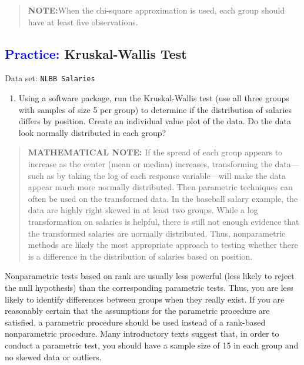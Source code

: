 \documentclass[
]{report}
\providecommand{\tightlist}{%
  \setlength{\itemsep}{0pt}\setlength{\parskip}{0pt}}
\begin{document}
\begin{quote}
\textbf{NOTE:}When the chi-square approximation is used, each group should have at least five observations.
\end{quote}

\hypertarget{kruskal-wallis-test}{%
\subsection*{\texorpdfstring{\textcolor{blue}{Practice:} Kruskal-Wallis Test}{ Kruskal-Wallis Test}}\label{kruskal-wallis-test}}

\vspace{-1em}

Data set: \texttt{NLBB\ Salaries}

\begin{enumerate}
\def\labelenumi{\arabic{enumi}.}
\setcounter{enumi}{27}
\tightlist
\item
  Using a software package, run the Kruskal-Wallis test (use all three groups with samples of size 5 per group) to determine if the distribution of salaries differs by position. Create an individual value plot of the data. Do the data look normally distributed in each group?
\end{enumerate}

\begin{quote}
\textbf{MATHEMATICAL NOTE:} If the spread of each group appears to increase as the center (mean or median) increases, transforming the data---such as by taking the log of each response variable---will make the data appear much more normally distributed. Then parametric techniques can often be used on the transformed data. In the baseball salary example, the data are highly right skewed in at least two groups. While a log transformation on salaries is helpful, there is still not enough evidence that the transformed salaries are normally distributed. Thus, nonparametric methods are likely the most appropriate approach to testing whether there is a difference in the distribution of salaries based on position.
\end{quote}

Nonparametric tests based on rank are usually less powerful (less likely to reject the null hypothesis) than the corresponding parametric tests. Thus, you are less likely to identify differences between groups when they really exist. If you are reasonably certain that the assumptions for the parametric procedure are satisfied, a parametric procedure should be used instead of a rank-based nonparametric procedure. Many introductory texts suggest that, in order to conduct a parametric test, you should have a sample size of 15 in each group and no skewed data or outliers.
\end{document}

